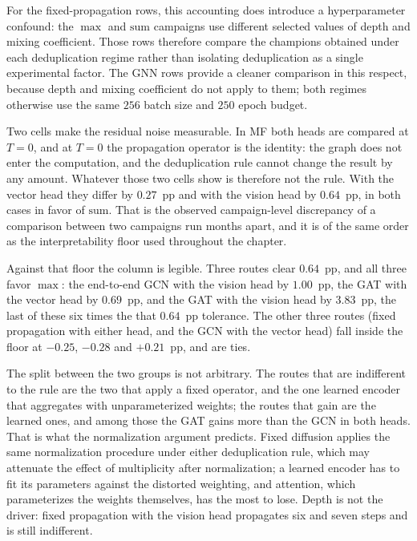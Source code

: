 \documentclass[Ingles]{ic-tese-v3}
\begin{document}
For the fixed-propagation rows, this accounting does introduce a hyperparameter confound: the $\max$ and $\mathrm{sum}$ campaigns use different selected values of depth and mixing coefficient. Those rows therefore compare the champions obtained under each deduplication regime rather than isolating deduplication as a single experimental factor. The GNN rows provide a cleaner comparison in this respect, because depth and mixing coefficient do not apply to them; both regimes otherwise use the same $256$ batch size and $250$ epoch budget.

Two cells make the residual noise measurable. In MF both
heads are compared at $T=0$, and at $T=0$ the propagation operator is the identity: the
graph does not enter the computation, and the deduplication rule cannot change the result
by any amount. Whatever those two cells show is therefore not the rule. With the vector head
they differ by $0.27$~pp and with the vision head by $0.64$~pp, in both cases in favor of
$\mathrm{sum}$. That is the observed campaign-level discrepancy of a comparison between two campaigns run
months apart, and it is of the same order as the interpretability floor used throughout the
chapter.

Against that floor the column is legible. Three routes clear $0.64$~pp, and all three favor
$\max$: the end-to-end GCN with the vision head by $1.00$~pp, the GAT with the vector head by
$0.69$~pp, and the GAT with the vision head by $3.83$~pp, the last of these six times the
that $0.64$~pp tolerance. The other three routes (fixed propagation with either head, and the GCN
with the vector head) fall inside the floor at $-0.25$, $-0.28$ and $+0.21$~pp, and are
ties.

The split between the two groups is not arbitrary. The routes that are indifferent to the
rule are the two that apply a fixed operator, and the one learned encoder that aggregates
with unparameterized weights; the routes that gain are the learned ones, and among those the
GAT gains more than the GCN in both heads. That is what the normalization argument predicts.
Fixed diffusion applies the same normalization procedure under either deduplication rule, which may attenuate the effect of multiplicity after normalization; a learned encoder has to fit its parameters against
the distorted weighting, and attention, which parameterizes the weights themselves, has the
most to lose. Depth is not the driver: fixed propagation with the vision head propagates
six and seven steps and is still indifferent.
\end{document}
